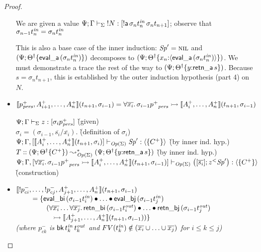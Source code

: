 \begin{proof}
\begin{itemize}
  \bigskip
  We are given a value 
  ${\Psi}; {\Gamma} \vdash_{\Sigma} {{!}{N}} : {[{{!}}{\sf a}\,\sigma_n{t^{\it in}_n}\,\sigma_n{t_{n+1}}]}$;
  observe that $\sigma_{n-1}{t_n^{\it in}} = \sigma_n{t_n^{\it in}}$

  \smallskip
  This is also a base case of the inner induction: ${\it Sp}' = \textsc{nil}$ and
  $(\Psi; 
  {{{\Theta}^\dag}}\{{{\sf eval\_a}\,(\sigma_{n}{t^{\it in}_n})}\})$
  decomposes to 
  $(\Psi; 
  {{{\Theta}^\dag}}\{{x_{n}{:}{\langle {{\sf eval\_a}\,(\sigma_{n}{t^{\it in}_n})} \rangle}}\})$.
  We must demonstrate a trace the rest of the way to
  $(\Psi; {{{\Theta}^\dag}}\{{y{:}{\sf retn\_a}\,s}\})$. Because 
  $s = \sigma_n{t_{n+1}}$, this is established by the 
  outer induction hypothesis (part 4) on $N$. 
  \bigskip

\item $\llbracket {p^+_{\it pers},A^+_{i+1},\ldots,A^+_n} \rrbracket({t_{n+1}},{\sigma_{i-1}}) 
  = \forall \overline{x_i}.\, \sigma_{i-1}{p^+}_{\it pers} \rightarrowtail \llbracket {A^+_i,\ldots,A^+_n} \rrbracket({t_{n+1}},{\sigma_{i-1}})$

  \begin{tabbing}
  ${\Psi}; {\Gamma} \vdash_{\Sigma} {z} : {[\sigma_i{p^+_{\it pers}}]}$
  \` (given) 
  \\
  $\sigma_i = (\sigma_{i-1}, \overline{s_i}/\overline{x_i})$.
  \` (definition of $\sigma_i$)
  \\
  ${\Psi}; {\Gamma, [\llbracket {A^+_i,\ldots,A^+_n} \rrbracket({t_{n+1}},{\sigma_{i}})]} \vdash_{{\it Op}({\Sigma})} {{\it Sp}'} : {\langle {\{ C^+ \} } \rangle}$
  \` (by inner ind. hyp.)
  \\
  $T :: (\Psi; {{{\Theta}^\dag}}\{{C^+}\}) \leadsto^*_{{\it Op}({\Sigma})}
   (\Psi; {{{\Theta}^\dag}}\{{y{:}{\sf retn\_a}\,s}\})$
  \` (by inner ind. hyp.)
  \\
  ${\Psi}; {\Gamma, [\forall \overline{x_i}.\, \sigma_{i-1}{p^+}_{\it pers} 
                \rightarrowtail \llbracket {A^+_i,\ldots,A^+_n} \rrbracket({t_{n+1}},{\sigma_{i-1}})]} \vdash_{{\it Op}({\Sigma})} {\left([{\overline{s_i}}]; {{z}{^{<}}{{\it Sp}'}}\right)} : {\langle {\{ C^+ \}} \rangle}$
  \\ 
  \` (construction)
  \end{tabbing}

\item $\llbracket {{!}p^-_{ci},\ldots,{!}p^-_{cj},A^+_{j+1},\ldots,A^+_n} \rrbracket({t_{n+1}},{\sigma_{i-1}})$
  \\
  $~ \qquad = \{ {\sf eval\_bi}\,({\sigma_{i-1}}t^{\it in}_i) 
                    \mathbin{\bullet}  \ldots \mathbin{\bullet}
                 {\sf eval\_bj}\,({\sigma_{i-1}}t^{\it in}_j)$
  \\
  $~ \qquad \qquad (\forall\overline{x_i}\ldots\forall\overline{x_j}.\, 
     {\sf retn\_bi}\,(\sigma_{i-1}{t^{\it out}_i})
     \mathbin{\bullet} \ldots \mathbin{\bullet} 
     {\sf retn\_bj}\,(\sigma_{i-1}{t^{\it out}_j})$
  \\
  $~ \qquad \qquad \quad
   \rightarrowtail \llbracket {A^+_{j+1},\ldots,A^+_n} \rrbracket({t_{n+1}},{\sigma_{i-1}})) \}$\\
  {\it (where
   $p^-_{ck}$ is ${\sf bk}\,t^{\it in}_k\,t^{\it out}_k$ 
   and $FV(t_k^{\it in}) \notin (\overline{x_i} \cup \ldots \cup \overline{x_j})$ 
   for $i \leq k \leq j$)}


\end{itemize}
\end{proof}
